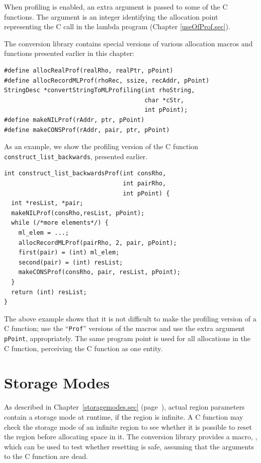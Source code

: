 \documentclass[12pt]{book}
\begin{document}
When profiling is enabled, an extra argument is passed to some of the C
functions. The argument is an integer identifying the allocation point
representing the C call in the lambda program (Chapter
\ref{useOfProf.sec}).

The conversion library contains special versions of various allocation
macros and functions presented earlier in this chapter:

\begin{verbatim}
#define allocRealProf(realRho, realPtr, pPoint)
#define allocRecordMLProf(rhoRec, ssize, recAddr, pPoint)
StringDesc *convertStringToMLProfiling(int rhoString, 
                                       char *cStr, 
                                       int pPoint);
#define makeNILProf(rAddr, ptr, pPoint)
#define makeCONSProf(rAddr, pair, ptr, pPoint)
\end{verbatim}

As an example, we show the profiling version of the C function
\texttt{construct\_\-list\_\-backwards}, presented earlier.

\begin{verbatim}
int construct_list_backwardsProf(int consRho, 
                                 int pairRho, 
                                 int pPoint) {
  int *resList, *pair;
  makeNILProf(consRho,resList, pPoint);  
  while (/*more elements*/) {
    ml_elem = ...;
    allocRecordMLProf(pairRho, 2, pair, pPoint);
    first(pair) = (int) ml_elem;
    second(pair) = (int) resList;
    makeCONSProf(consRho, pair, resList, pPoint);
  }
  return (int) resList;
}
\end{verbatim}

The above example shows that it is not difficult to make the profiling
version of a C function; use the ``\texttt{Prof}'' versions of the
macros and use the extra argument \texttt{pPoint}, appropriately. The
same program point is used for all allocations in the C function,
perceiving the C function as one entity.

\section{Storage Modes}
As described in Chapter~\ref{storagemodes.sec} (page~\pageref{atbit.lab}), 
actual region parameters contain
a storage mode at runtime, if the region is infinite. 
A C function may check the storage mode of an
infinite region to see whether it is possible to reset the region before
allocating space in it. The conversion library provides a macro,
\mbox{}, 
which can be used to test whether 
resetting is safe, assuming that the arguments to the
C function are dead.
\end{document}
